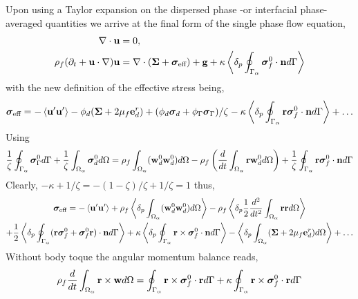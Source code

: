 \documentclass[12pt]{My_preprint}
\begin{document}
Upon using a Taylor expansion on the dispersed phase -or interfacial phase- averaged quantities we arrive at the final form of the single phase flow equation, 
\begin{align}
    \mathbf{\nabla}\cdot \textbf{u} &= 0, \\
    \rho_f (\partial_t + \textbf{u} \cdot \mathbf{\nabla}) \textbf{u}
    &= 
    \mathbf{\nabla}\cdot (\bm\Sigma
    + \bm\sigma_\text{eff})
    + \textbf{g}
    + \kappa \left<\delta_p \oint_{\Gamma_{\alpha}} \bm\sigma_f^0  \cdot \textbf{n} d\Gamma\right>
\end{align}
with the new definition of the effective stress being, 
\begin{multline}
    \bm\sigma_\text{eff}
    = -\left<\textbf{u}'\textbf{u}'\right>
    - \phi_d (\bm\Sigma + 2\mu_f \textbf{e}_d^r)
    + (\phi_d \bm\sigma_d 
    + \phi_\Gamma \bm\sigma_\Gamma) /\zeta 
    - \kappa \left<\delta_p \oint_{\Gamma_{\alpha}} \textbf{r}\bm\sigma_f^0  \cdot \textbf{n} d\Gamma\right>
    + \ldots\\
\end{multline}
Using 
\begin{multline}
    \frac{1}{\zeta}\oint_{\Gamma_{\alpha}} \bm{\sigma}_\Gamma^0 d\Gamma
    +\frac{1}{\zeta}\int_{\Omega_{\alpha}} \bm{\sigma}_d^0 d\Omega
    = \rho_f \int_{\Omega_{\alpha}} (\textbf{w}_d^0\textbf{w}_d^0) d\Omega
    - \rho_f\left(\frac{d}{dt}\int_{\Omega_{\alpha}}  \textbf{rw}_d^0 d\Omega \right)
    + \frac{1}{\zeta}\oint_{\Gamma_{\alpha}}  \textbf{r} \bm\sigma_f^0 \cdot \textbf{n} d\Gamma
\end{multline}
Clearly, $- \kappa + 1 /\zeta = - (1- \zeta)/\zeta + 1/\zeta =1$ thus, 
\begin{multline}
    \bm\sigma_\text{eff}
    = -\left<\textbf{u}'\textbf{u}'\right>
    + \rho_f \left<\delta_p \int_{\Omega_{\alpha}} (\textbf{w}_d^0\textbf{w}_d^0) d\Omega\right>
    - \rho_f\left<\delta_p \frac{1}{2}\frac{d^2}{dt^2}\int_{\Omega_{\alpha}}  \textbf{rr} d\Omega\right>\\
    + \frac{1}{2}\left<\delta_p \oint_{\Gamma_{\alpha}} (\textbf{r}\bm\sigma_f^0 + \bm\sigma_f^0\textbf{r} ) \cdot \textbf{n} d\Gamma\right>
    +\kappa \left<\delta_p \oint_{\Gamma_{\alpha}} \textbf{r}\times\bm\sigma_f^0  \cdot \textbf{n} d\Gamma\right>
    - \left<\delta_p \int_{\Omega_{\alpha}} (\bm\Sigma + 2\mu_f \textbf{e}_d^r) d\Omega\right>
    + \ldots\\
\end{multline}
Without body toque the angular momentum balance reads, 
\begin{equation}
    \rho_f \frac{d}{dt} \int_{\Omega_{\alpha}} \textbf{r}\times \textbf{w} d\Omega
    = 
    \oint_{\Gamma_{\alpha}} \textbf{r}\times\bm\sigma_f^0 \cdot \textbf{r} d\Gamma
    + \kappa \oint_{\Gamma_{\alpha}} \textbf{r}\times\bm\sigma_f^0 \cdot \textbf{r} d\Gamma
\end{equation}
\end{document}
